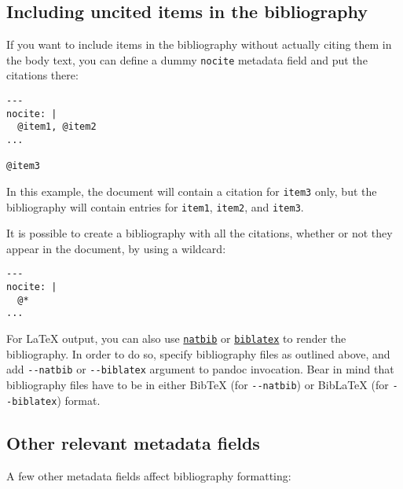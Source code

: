 \hypertarget{including-uncited-items-in-the-bibliography}{%
\subsection{Including uncited items in the
bibliography}\label{including-uncited-items-in-the-bibliography}}

If you want to include items in the bibliography without actually citing
them in the body text, you can define a dummy \texttt{nocite} metadata
field and put the citations there:

\begin{verbatim}
---
nocite: |
  @item1, @item2
...

@item3
\end{verbatim}

In this example, the document will contain a citation for \texttt{item3}
only, but the bibliography will contain entries for \texttt{item1},
\texttt{item2}, and \texttt{item3}.

It is possible to create a bibliography with all the citations, whether
or not they appear in the document, by using a wildcard:

\begin{verbatim}
---
nocite: |
  @*
...
\end{verbatim}

For LaTeX output, you can also use
\href{https://ctan.org/pkg/natbib}{\texttt{natbib}} or
\href{https://ctan.org/pkg/biblatex}{\texttt{biblatex}} to render the
bibliography. In order to do so, specify bibliography files as outlined
above, and add \texttt{-\/-natbib} or \texttt{-\/-biblatex} argument to
pandoc invocation. Bear in mind that bibliography files have to be in
either BibTeX (for \texttt{-\/-natbib}) or BibLaTeX (for
\texttt{-\/-biblatex}) format.

\hypertarget{other-relevant-metadata-fields}{%
\subsection{Other relevant metadata
fields}\label{other-relevant-metadata-fields}}

A few other metadata fields affect bibliography formatting:

